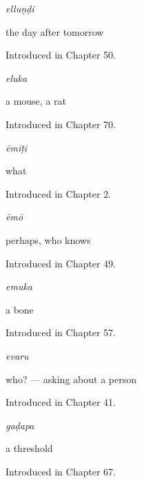 \noindent\begin{minipage}[t]{\linewidth}
\raggedright
\textbf{}\enspace\emph{elluṇḍi}\par
\small the day after tomorrow\par
\footnotesize Introduced in Chapter 50.
\end{minipage}\par\medskip

\noindent\begin{minipage}[t]{\linewidth}
\raggedright
\textbf{}\enspace\emph{eluka}\par
\small a mouse, a rat\par
\footnotesize Introduced in Chapter 70.
\end{minipage}\par\medskip

\noindent\begin{minipage}[t]{\linewidth}
\raggedright
\textbf{}\enspace\emph{ēmiṭi}\par
\small what\par
\footnotesize Introduced in Chapter 2.
\end{minipage}\par\medskip

\noindent\begin{minipage}[t]{\linewidth}
\raggedright
\textbf{}\enspace\emph{ēmō}\par
\small perhaps, who knows\par
\footnotesize Introduced in Chapter 49.
\end{minipage}\par\medskip

\noindent\begin{minipage}[t]{\linewidth}
\raggedright
\textbf{}\enspace\emph{emuka}\par
\small a bone\par
\footnotesize Introduced in Chapter 57.
\end{minipage}\par\medskip

\noindent\begin{minipage}[t]{\linewidth}
\raggedright
\textbf{}\enspace\emph{evaru}\par
\small who? — asking about a person\par
\footnotesize Introduced in Chapter 41.
\end{minipage}\par\medskip

\noindent\begin{minipage}[t]{\linewidth}
\raggedright
\textbf{}\enspace\emph{gaḍapa}\par
\small a threshold\par
\footnotesize Introduced in Chapter 67.
\end{minipage}\par\medskip

